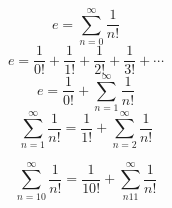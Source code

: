 \documentclass[a4paper,10pt]{article}
\title{}
\author{}
\begin{document}
$$ e = \sum_{n=0}^\infty \frac{1}{n!} $$
$$ e = \frac{1}{0!} + \frac{1}{1!} + \frac{1}{2!} + \frac{1}{3!} + \cdots $$
$$ e = \frac{1}{0!} + \sum_{n=1}^\infty \frac{1}{n!}$$
$$ \sum_{n=1}^\infty \frac{1}{n!} = \frac{1}{1!} + \sum_{n=2}^\infty \frac{1}{n!} $$

$$ \sum_{n=10}^\infty \frac{1}{n!} = \frac{1}{10!} + \sum_{n11}^\infty \frac{1}{n!} $$
\end{document}

